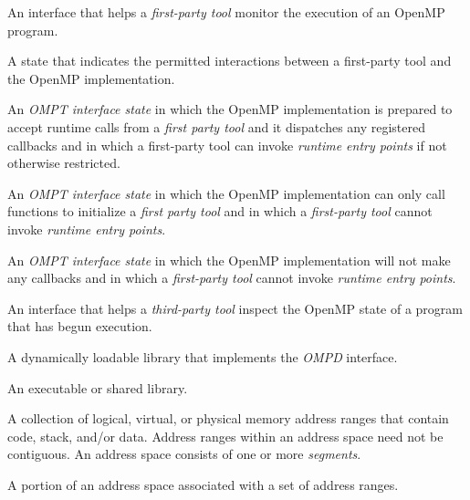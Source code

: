 \glossarydefstart
An interface that helps a \emph{first-party tool} monitor the execution 
of an OpenMP program.
\glossarydefend

\glossarydefstart
A state that indicates the permitted interactions between a first-party 
tool and the OpenMP implementation.
\glossarydefend

\glossarydefstart
An \emph{OMPT interface state} in which the OpenMP implementation is 
prepared to accept runtime calls from a \emph{first party tool} and it 
dispatches any registered callbacks and in which a first-party tool can 
invoke \emph{runtime entry points} if not otherwise restricted.
\glossarydefend

\glossarydefstart
An \emph{OMPT interface state} in which the OpenMP implementation can 
only call functions to initialize a \emph{first party tool} and in which 
a \emph{first-party tool} cannot invoke \emph{runtime entry points}.
\glossarydefend

\glossarydefstart
An \emph{OMPT interface state} in which the OpenMP implementation will 
not make any callbacks and in which a \emph{first-party tool} cannot 
invoke \emph{runtime entry points}.
\glossarydefend

\glossarydefstart
An interface that helps a \emph{third-party tool} inspect the OpenMP state 
of a program that has begun execution.
\glossarydefend

\glossarydefstart
A dynamically loadable library that implements the \emph{OMPD} interface.
\glossarydefend

\glossarydefstart
An executable or shared library.
\glossarydefend

\glossarydefstart
A collection of logical, virtual, or physical memory address ranges 
that contain code, stack, and/or data. 
Address ranges within an address space need not be contiguous.  
An address space consists of one or more \emph{segments}.
\glossarydefend

\glossarydefstart
A portion of an address space associated with a set of address ranges.
\glossarydefend

\begin{comment}
\glossaryterm{architecture}
\glossarydefstart
A combination of the processor and the Application Binary Interface (ABI) used by
threads and address spaces.
\glossarydefend
\end{comment}

